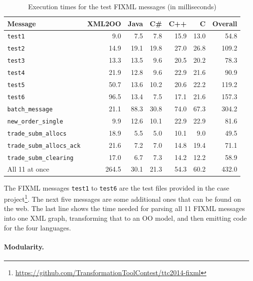 \documentclass[a4paper]{article}
\begin{document}
\begin{table}[h!t]
  \centering
  \begin{tabular}{| l | r | r | r | r | r | r |}
    \hline
    \textbf{Message} & \textbf{XML2OO} & \textbf{Java} & \textbf{C\#} & \textbf{C++} & \textbf{C} & \textbf{Overall}\\
    \hline
    \texttt{test1}                    & 9.0   & 7.5  & 7.8  & 15.9 & 13.0 & 54.8\\
    \texttt{test2}                    & 14.9  & 19.1 & 19.8 & 27.0 & 26.8 & 109.2\\
    \texttt{test3}                    & 13.3  & 13.5 & 9.6  & 20.5 & 20.2 & 78.3\\
    \texttt{test4}                    & 21.9  & 12.8 & 9.6  & 22.9 & 21.6 & 90.9\\
    \texttt{test5}                    & 50.7  & 13.6 & 10.2 & 20.6 & 22.2 & 119.2\\
    \texttt{test6}                    & 96.5  & 13.4 & 7.5  & 17.1 & 21.6 & 157.3\\
    \hline
    \texttt{batch\_message}           & 21.1  & 88.3 & 30.8 & 74.0 & 67.3 & 304.2\\
    \texttt{new\_order\_single}       & 9.9   & 12.6 & 10.1 & 22.9 & 22.9 & 81.6\\
    \texttt{trade\_subm\_allocs}      & 18.9  & 5.5  & 5.0  & 10.1 & 9.0  & 49.5\\
    \texttt{trade\_subm\_allocs\_ack} & 21.6  & 7.2  & 7.0  & 14.8 & 19.4 & 71.1\\
    \texttt{trade\_subm\_clearing}    & 17.0  & 6.7  & 7.3  & 14.2 & 12.2 & 58.9\\
    \hline
    All 11 at once                    & 264.5 & 30.1 & 21.3 & 54.3 & 60.2 & 432.0\\
    \hline
  \end{tabular}
  \caption{Execution times for the test FIXML messages (in milliseconds)}
  \label{tab:exec-times}
\end{table}

The FIXML messages \texttt{test1} to \texttt{test6} are the test files provided
in the case
project\footnote{\url{https://github.com/TransformationToolContest/ttc2014-fixml}}.
The next five messages are some additional ones that can be found on the web.
The last line shows the time needed for parsing all 11 FIXML messages into one
XML graph, transforming that to an OO model, and then emitting code for the
four languages.


\paragraph{Modularity.}
\label{sec:modularity}
\end{document}
